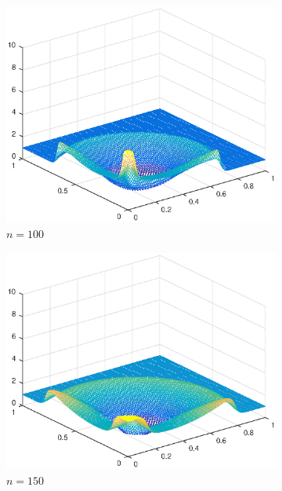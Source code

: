 \begin{figure}[h!]
    \begin{subfigure}[t]{0.48\textwidth}
        \centering
        \includegraphics[width=\textwidth]{images/sol_ri_0100.eps}
        \caption{$n=100$}
        \label{fig:50}
    \end{subfigure}
    \begin{subfigure}[t]{0.48\textwidth}
        \centering
        \includegraphics[width=\textwidth]{images/sol_ri_0150.eps}
        \caption{$n=150$}
        \label{fig:100}
    \end{subfigure}
    \begin{subfigure}[t]{0.48\textwidth}

\end{subfigure}
\end{figure}
